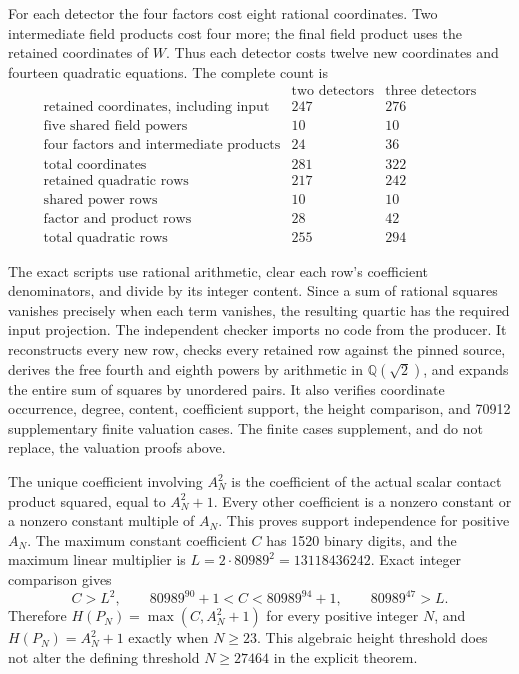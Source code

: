 \documentclass[11pt,a4paper]{article}
\theoremstyle{remark}\newtheorem{remark}[theorem]{Remark}
\newcommand{\Q}{\mathbb Q}\newcommand{\Z}{\mathbb Z}\newcommand{\HH}{\mathcal H}
\begin{document}
For each detector the four factors cost eight rational coordinates.
Two intermediate field products cost four more; the final field
product uses the retained coordinates of $W$. Thus each detector
costs twelve new coordinates and fourteen quadratic equations.
The complete count is
\[
\begin{array}{c|rr}
 &\text{two detectors}&\text{three detectors}\\\hline
\text{retained coordinates, including input}&247&276\\
\text{five shared field powers}&10&10\\
\text{four factors and intermediate products}&24&36\\\hline
\text{total coordinates}&281&322\\
\text{retained quadratic rows}&217&242\\
\text{shared power rows}&10&10\\
\text{factor and product rows}&28&42\\\hline
\text{total quadratic rows}&255&294
\end{array}
\]

The exact scripts use rational arithmetic, clear each row's
coefficient denominators, and divide by its integer content. Since a
sum of rational squares vanishes precisely when each term vanishes,
the resulting quartic has the required input projection.
The independent checker imports no code from the producer. It
reconstructs every new row, checks every retained row against the
pinned source, derives the free fourth and eighth powers by arithmetic
in $\Q(\sqrt2)$, and expands the entire sum of squares by unordered
pairs. It also verifies coordinate occurrence, degree, content,
coefficient support, the height comparison, and 70912 supplementary
finite valuation cases. The finite cases supplement, and do not replace,
the valuation proofs above.

The unique coefficient involving $A_N^2$ is the coefficient of the
actual scalar contact product squared, equal to $A_N^2+1$.
Every other coefficient is a nonzero constant or a nonzero constant
multiple of $A_N$. This proves support independence for positive
$A_N$. The maximum constant coefficient $C$ has 1520 binary digits,
and the maximum linear multiplier is
$L=2\cdot80989^2=13118436242$. Exact integer comparison gives
\[
 C>L^2,\qquad 80989^{90}+1<C<80989^{94}+1,\qquad 80989^{47}>L.
\]
Therefore $H(P_N)=\max(C,A_N^2+1)$ for every positive integer $N$,
and $H(P_N)=A_N^2+1$ exactly when $N\ge23$.
This algebraic height threshold does not alter the defining threshold
$N\ge27464$ in the explicit theorem.
\end{document}
